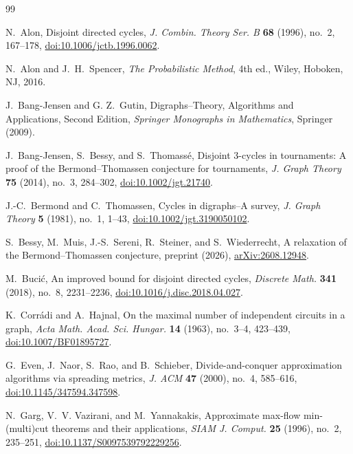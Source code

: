 \documentclass[a4paper,12pt]{article}
\numberwithin{equation}{section}
\begin{document}
\begin{thebibliography}{99}
\small
\setlength{\parskip}{0pt}
\setlength{\itemsep}{0pt}
\setlength{\parsep}{0pt}
\setlength{\labelsep}{0.3em}


N.~Alon, Disjoint directed cycles,
\emph{J. Combin. Theory Ser. B} \textbf{68} (1996), no.~2, 167--178,
\href{https://doi.org/10.1006/jctb.1996.0062}{doi:10.1006/jctb.1996.0062}.


N.~Alon and J.~H.~Spencer,
\emph{The Probabilistic Method},
4th ed., Wiley, Hoboken, NJ, 2016.

J.~Bang{-}Jensen and G. Z.~Gutin,
Digraphs--Theory, Algorithms and Applications, Second Edition,
\emph{Springer Monographs in Mathematics},
Springer (2009). 

J.~Bang-Jensen, S.~Bessy, and S.~Thomass\'{e},
Disjoint 3-cycles in tournaments: A proof of the
Bermond--Thomassen conjecture for tournaments,
\emph{J. Graph Theory} \textbf{75} (2014),
no.~3, 284--302,
\href{https://doi.org/10.1002/jgt.21740}{doi:10.1002/jgt.21740}.


J.-C.~Bermond and C.~Thomassen,
Cycles in digraphs--A survey,
\emph{J. Graph Theory} \textbf{5} (1981), no.~1, 1--43,
\href{https://doi.org/10.1002/jgt.3190050102}{doi:10.1002/jgt.3190050102}.


S.~Bessy, M.~Muis, J.-S.~Sereni, R.~Steiner, and S.~Wiederrecht,
A relaxation of the Bermond--Thomassen conjecture,
preprint (2026),
\href{https://arxiv.org/abs/2608.12948}{arXiv:2608.12948}.


M.~Buci\'c, An improved bound for disjoint directed cycles,
\emph{Discrete Math.} \textbf{341} (2018), no.~8, 2231--2236,
\href{https://doi.org/10.1016/j.disc.2018.04.027}{doi:10.1016/j.disc.2018.04.027}.


K.~Corr\'{a}di and A.~Hajnal,
On the maximal number of independent circuits in a graph,
\emph{Acta Math. Acad. Sci. Hungar.} \textbf{14} (1963),
no.~3--4, 423--439,
\href{https://doi.org/10.1007/BF01895727}{doi:10.1007/BF01895727}.


G.~Even, J.~Naor, S.~Rao, and B.~Schieber, Divide-and-conquer
approximation algorithms via spreading metrics,
\emph{J. ACM} \textbf{47} (2000), no.~4, 585--616,
\href{https://doi.org/10.1145/347594.347598}{doi:10.1145/347594.347598}.


N.~Garg, V.~V. Vazirani, and M.~Yannakakis, Approximate max-flow
min-(multi)cut theorems and their applications,
\emph{SIAM J. Comput.} \textbf{25} (1996), no.~2, 235--251,
\href{https://doi.org/10.1137/S0097539792229256}{doi:10.1137/S0097539792229256}.



\end{thebibliography}
\end{document}
